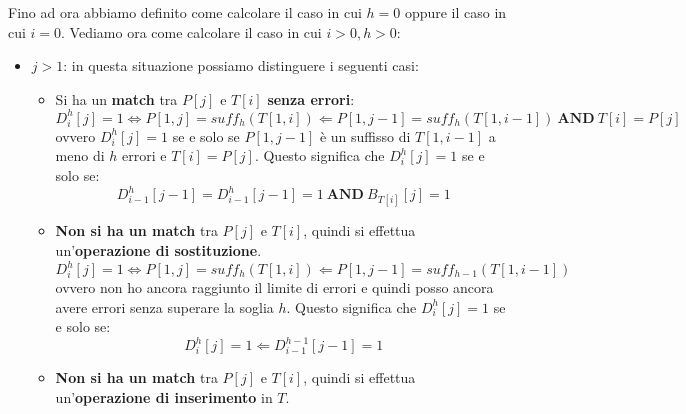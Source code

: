 Fino ad ora abbiamo definito come calcolare il caso in cui $h = 0$ oppure il
caso in cui $i = 0$. Vediamo ora come calcolare il caso in cui $i > 0, h > 0$:
\begin{itemize}
    \item $j > 1$: in questa situazione possiamo distinguere i seguenti casi:
          \begin{itemize}
              \item Si ha un \textbf{match} tra $P[j]$ e $T[i]$ \textbf{senza
                        errori}:
                    \begin{equation}
                        D_i^h[j] = 1 \iff P[1, j] = suff_h(T[1, i]) \Leftarrow
                        P[1, j - 1] = suff_h(T[1, i - 1]) \  \textbf{AND} \ T[i]
                        = P[j]
                    \end{equation}
                    ovvero $D_i^h[j] = 1$ se e solo se $P[1, j - 1]$ è un
                    suffisso di $T[1, i - 1]$ a meno di $h$ errori e $T[i] =
                        P[j]$. Questo significa che $D_i^h[j] = 1$ se e solo se:
                    \begin{equation}
                        D_{i - 1}^h[j - 1] = D_{i - 1}^h [j - 1] = 1 \
                        \textbf{AND} \ B_{T[i]} [j] =  1
                    \end{equation}
              \item \textbf{Non si ha un match} tra $P[j]$ e $T[i]$,
                    quindi si effettua un'\textbf{operazione di sostituzione}.
                    \begin{equation}
                        D_i^h[j] = 1 \iff P[1, j] = suff_h(T[1, i]) \Leftarrow
                        P[1, j - 1] = suff_{h - 1}(T[1, i - 1])
                    \end{equation}
                    ovvero non ho ancora raggiunto il limite di errori e quindi
                    posso ancora avere errori senza superare la soglia $h$.
                    Questo significa che $D_i^h[j] = 1$ se e solo se:
                    \begin{equation}
                        D_i^h[j] = 1 \Leftarrow D_{i - 1}^{h - 1} [j - 1] = 1
                    \end{equation}
              \item \textbf{Non si ha un match} tra $P[j]$ e $T[i]$, quindi si
                    effettua un'\textbf{operazione di inserimento} in $T$.
                    \begin{equation}

\end{equation}
\end{itemize}
\end{itemize}
